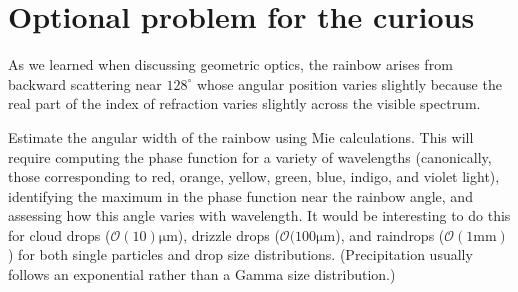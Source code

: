 \documentclass{article}
\begin{document}
\section{Optional problem for the curious}

As we learned when discussing geometric optics, the rainbow arises from backward scattering near $128^{\circ}$ whose angular position varies slightly because the real part of the index of refraction varies slightly across the visible spectrum. 

Estimate the angular width of the rainbow using Mie calculations. This will require computing the phase function for a variety of wavelengths (canonically, those corresponding  to red, orange, yellow, green, blue, indigo, and violet light), identifying the maximum in the phase function near the rainbow angle, and assessing how this angle varies with wavelength. It would be interesting to do this for cloud drops ($\mathcal{O}(10)  \si{\micro\meter}$), drizzle drops ($\mathcal{O}(100  \si{\micro\meter}$), and raindrops ($\mathcal{O}(1 \si{\milli\meter})$) for both single particles and drop size distributions. (Precipitation usually follows an exponential rather than a Gamma size distribution.) 
\end{document}
